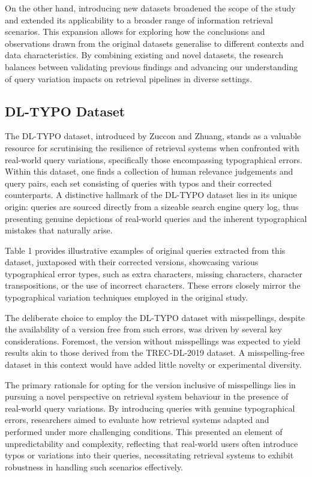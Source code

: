 On the other hand, introducing new datasets broadened the scope of the study and extended its applicability to a broader range of information retrieval scenarios. This expansion allows for exploring how the conclusions and observations drawn from the original datasets generalise to different contexts and data characteristics. By combining existing and novel datasets, the research balances between validating previous findings and advancing our understanding of query variation impacts on retrieval pipelines in diverse settings.

\subsection{DL-TYPO Dataset}
The DL-TYPO dataset, introduced by Zuccon and Zhuang, stands as a valuable resource for scrutinising the resilience of retrieval systems when confronted with real-world query variations, specifically those encompassing typographical errors. Within this dataset, one finds a collection of human relevance judgements and query pairs, each set consisting of queries with typos and their corrected counterparts. A distinctive hallmark of the DL-TYPO dataset lies in its unique origin: queries are sourced directly from a sizeable search engine query log, thus presenting genuine depictions of real-world queries and the inherent typographical mistakes that naturally arise.

Table 1 provides illustrative examples of original queries extracted from this dataset, juxtaposed with their corrected versions, showcasing various typographical error types, such as extra characters, missing characters, character transpositions, or the use of incorrect characters. These errors closely mirror the typographical variation techniques employed in the original study.

The deliberate choice to employ the DL-TYPO dataset with misspellings, despite the availability of a version free from such errors, was driven by several key considerations. Foremost, the version without misspellings was expected to yield results akin to those derived from the TREC-DL-2019 dataset. A misspelling-free dataset in this context would have added little novelty or experimental diversity.

The primary rationale for opting for the version inclusive of misspellings lies in pursuing a novel perspective on retrieval system behaviour in the presence of real-world query variations. By introducing queries with genuine typographical errors, researchers aimed to evaluate how retrieval systems adapted and performed under more challenging conditions. This presented an element of unpredictability and complexity, reflecting that real-world users often introduce typos or variations into their queries, necessitating retrieval systems to exhibit robustness in handling such scenarios effectively.

